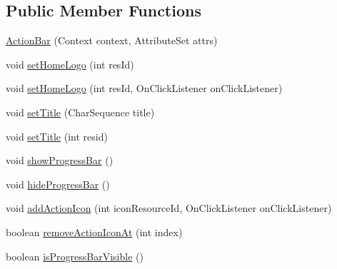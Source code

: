 \subsection*{Public Member Functions}
\begin{DoxyCompactItemize}
\item 
\hyperlink{classcom_1_1thira_1_1examples_1_1actionbar_1_1widget_1_1_action_bar_a45414f21cf875edbd288e9e521a64ad1}{Action\-Bar} (Context context, Attribute\-Set attrs)
\item 
void \hyperlink{classcom_1_1thira_1_1examples_1_1actionbar_1_1widget_1_1_action_bar_a3fae9dd666ad12891b9d9a96918652de}{set\-Home\-Logo} (int res\-Id)
\item 
void \hyperlink{classcom_1_1thira_1_1examples_1_1actionbar_1_1widget_1_1_action_bar_a6085d9e0d9776b9893f00c02b9a7c3a8}{set\-Home\-Logo} (int res\-Id, On\-Click\-Listener on\-Click\-Listener)
\item 
void \hyperlink{classcom_1_1thira_1_1examples_1_1actionbar_1_1widget_1_1_action_bar_a9940796cc1b0e1a6169da32cf75593e9}{set\-Title} (Char\-Sequence title)
\item 
void \hyperlink{classcom_1_1thira_1_1examples_1_1actionbar_1_1widget_1_1_action_bar_a704095073507862211214b17a106249b}{set\-Title} (int resid)
\item 
void \hyperlink{classcom_1_1thira_1_1examples_1_1actionbar_1_1widget_1_1_action_bar_a1483342c600fcea3fe48953f8773ac18}{show\-Progress\-Bar} ()
\item 
void \hyperlink{classcom_1_1thira_1_1examples_1_1actionbar_1_1widget_1_1_action_bar_a29a2b3a12e2ad549fc16eeef9e81714f}{hide\-Progress\-Bar} ()
\item 
void \hyperlink{classcom_1_1thira_1_1examples_1_1actionbar_1_1widget_1_1_action_bar_a0e3a9b81ca94496856105e3390f34266}{add\-Action\-Icon} (int icon\-Resource\-Id, On\-Click\-Listener on\-Click\-Listener)
\item 
boolean \hyperlink{classcom_1_1thira_1_1examples_1_1actionbar_1_1widget_1_1_action_bar_ad83d48f27fc9972e22c0b3605f4a45ea}{remove\-Action\-Icon\-At} (int index)
\item 
boolean \hyperlink{classcom_1_1thira_1_1examples_1_1actionbar_1_1widget_1_1_action_bar_a9d9ec9d5202b704dfed806d8a5ca9bf9}{is\-Progress\-Bar\-Visible} ()
\end{DoxyCompactItemize}


